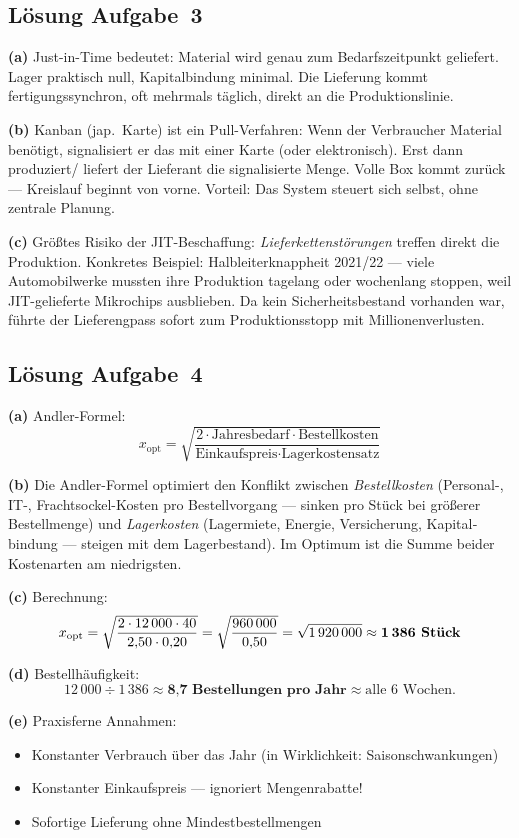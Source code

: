 \documentclass[11pt, a4paper]{article}
\begin{document}
\subsection*{Lösung Aufgabe~3}
\begin{loesung}
\textbf{(a)} Just-in-Time bedeutet: Material wird genau zum Bedarfszeit\-punkt geliefert.
Lager praktisch null, Kapital­bindung minimal. Die Lieferung kommt fertigungs\-synchron,
oft mehrmals täglich, direkt an die Produktionslinie.

\textbf{(b)} Kanban (jap.\ Karte) ist ein Pull-Verfahren: Wenn der Verbraucher Material
benötigt, signalisiert er das mit einer Karte (oder elektronisch). Erst dann produziert/
liefert der Lieferant die signalisierte Menge. Volle Box kommt zurück --- Kreislauf
beginnt von vorne. Vorteil: Das System steuert sich selbst, ohne zentrale Planung.

\textbf{(c)} Größtes Risiko der JIT-Beschaffung: \emph{Lieferketten\-störungen} treffen
direkt die Produktion. Konkretes Beispiel: Halbleiter\-knappheit 2021/22 --- viele
Automobil\-werke mussten ihre Produktion tagelang oder wochenlang stoppen, weil
JIT-gelieferte Mikrochips ausblieben. Da kein Sicherheitsbestand vorhanden war,
führte der Lieferengpass sofort zum Produktions\-stopp mit Millionen­verlusten.
\end{loesung}

\subsection*{Lösung Aufgabe~4}
\begin{loesung}
\textbf{(a)} Andler-Formel:
\[
x_{\text{opt}} = \sqrt{\frac{2 \cdot \text{Jahresbedarf} \cdot \text{Bestellkosten}}{\text{Einkaufspreis} \cdot \text{Lagerkostensatz}}}
\]

\textbf{(b)} Die Andler-Formel optimiert den Konflikt zwischen \emph{Bestellkosten}
(Personal-, IT-, Frachtsockel-Kosten pro Bestellvorgang --- sinken pro Stück bei größerer
Bestellmenge) und \emph{Lagerkosten} (Lagermiete, Energie, Versicherung, Kapital­bindung
--- steigen mit dem Lagerbestand). Im Optimum ist die Summe beider Kostenarten am
niedrigsten.

\textbf{(c)} Berechnung:
\[
x_{\text{opt}} = \sqrt{\frac{2 \cdot 12\,000 \cdot 40}{2{,}50 \cdot 0{,}20}}
= \sqrt{\frac{960\,000}{0{,}50}}
= \sqrt{1\,920\,000}
\approx \textbf{1\,386 Stück}
\]

\textbf{(d)} Bestellhäufigkeit:
$$12\,000 \div 1\,386 \approx \textbf{8{,}7 Bestellungen pro Jahr} \approx \text{alle 6 Wochen.}$$

\textbf{(e)} Praxisferne Annahmen:
\begin{itemize}[itemsep=0pt]
  \item Konstanter Verbrauch über das Jahr (in Wirklichkeit: Saisonschwankungen)
  \item Konstanter Einkaufspreis --- ignoriert Mengenrabatte!
  \item Sofortige Lieferung ohne Mindestbestellmengen
\end{itemize}
\end{loesung}
\end{document}

